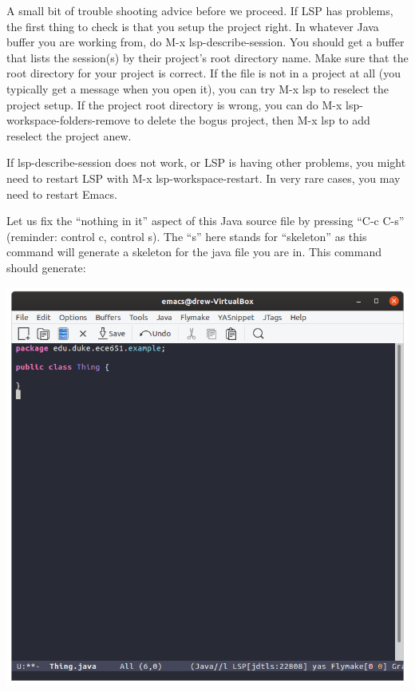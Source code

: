 \documentclass[12pt]{article}
\begin{document}
A small bit of trouble shooting advice before we proceed.  If LSP has
problems, the first thing to check is that you setup the project
right.  In whatever Java buffer you are working from, do M-x
lsp-describe-session.  You should get a buffer that lists the
session(s) by their project's root directory name.  Make sure that the
root directory for your project is correct.  If the file is not in a
project at all (you typically get a message when you open it), you can try
M-x lsp to reselect the project setup.  If the project root directory
is wrong, you can do M-x lsp-workspace-folders-remove to delete the bogus
project, then M-x lsp to add reselect the project anew.

If lsp-describe-session does not work, or LSP is having other
problems, you might need to restart LSP with M-x
lsp-workspace-restart. In very rare cases, you may need to restart
Emacs.


Let us fix the ``nothing in it'' aspect of this Java source file by
pressing ``C-c C-s'' (reminder: control c, control s).  The ``s'' here
stands for ``skeleton'' as this command will generate a skeleton for
the java file you are in. This command should generate:
\begin{center}
\includegraphics[width=5.5in]{emacs-skel.png}
\end{center}
\end{document}
